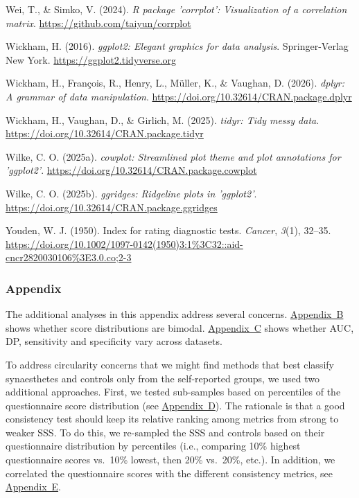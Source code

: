 \documentclass[
  man,
  floatsintext,
  longtable,
  nolmodern,
  notxfonts,
  notimes,
  colorlinks=true,linkcolor=blue,citecolor=blue,urlcolor=blue]{apa7}
\newlength{\cslhangindent}
\newenvironment{CSLReferences}[2] %
 {\begin{list}{}{%
  \setlength{\itemindent}{0pt}
  \setlength{\leftmargin}{0pt}
  \setlength{\parsep}{0pt}
  \ifodd #1
   \setlength{\leftmargin}{\cslhangindent}
   \setlength{\itemindent}{-1\cslhangindent}
  \fi
  \setlength{\itemsep}{#2\baselineskip}}}
 {\end{list}}
\begin{document}
\begin{CSLReferences}{1}{0}
Wei, T., \& Simko, V. (2024). \emph{R package '{corrplot}':
Visualization of a correlation matrix}.
\url{https://github.com/taiyun/corrplot}

Wickham, H. (2016). \emph{{ggplot2}: Elegant graphics for data
analysis}. Springer-Verlag New York. \url{https://ggplot2.tidyverse.org}

Wickham, H., François, R., Henry, L., Müller, K., \& Vaughan, D. (2026).
\emph{{dplyr}: A grammar of data manipulation}.
\url{https://doi.org/10.32614/CRAN.package.dplyr}

Wickham, H., Vaughan, D., \& Girlich, M. (2025). \emph{{tidyr}: Tidy
messy data}. \url{https://doi.org/10.32614/CRAN.package.tidyr}

Wilke, C. O. (2025a). \emph{{cowplot}: Streamlined plot theme and plot
annotations for 'ggplot2'}.
\url{https://doi.org/10.32614/CRAN.package.cowplot}

Wilke, C. O. (2025b). \emph{{ggridges}: Ridgeline plots in 'ggplot2'}.
\url{https://doi.org/10.32614/CRAN.package.ggridges}

Youden, W. J. (1950). Index for rating diagnostic tests. \emph{Cancer},
\emph{3}(1), 32--35.
\url{https://doi.org/10.1002/1097-0142(1950)3:1\%3C32::aid-cncr2820030106\%3E3.0.co;2-3}

\end{CSLReferences}

\newpage{}

\subsubsection{Appendix}\label{appendix}

The additional analyses in this appendix address several concerns.
\hyperref[apx-featDensity]{Appendix~B} shows whether score distributions
are bimodal. \hyperref[apx-SM2byds]{Appendix~C} shows whether AUC, DP,
sensitivity and specificity vary across datasets.

To address circularity concerns that we might find methods that best
classify synaesthetes and controls only from the self-reported groups,
we used two additional approaches. First, we tested sub-samples based on
percentiles of the questionnaire score distribution (see
\hyperref[apx-byquestperc]{Appendix~D}). The rationale is that a good
consistency test should keep its relative ranking among metrics from
strong to weaker SSS. To do this, we re-sampled the SSS and controls
based on their questionnaire distribution by percentiles (i.e.,
comparing 10\% highest questionnaire scores vs.~10\% lowest, then 20\%
vs.~20\%, etc.). In addition, we correlated the questionnaire scores
with the different consistency metrics, see
\hyperref[apx-correlation-with-self-report]{Appendix~E}.
\end{document}
